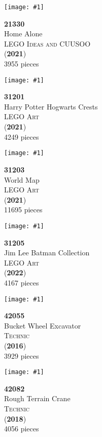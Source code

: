 \documentclass[letterpaper]{article}%
\newenvironment{legocell}[1]
{
	\begin{minipage}[c][2.0in][c]{4in}
	\centering
	\varwidth{3.6in}
	\raggedright %
	\begin{minipage}[c]{1.3in}
		\texttt{[image: \#1]}
	\end{minipage}
	\begin{minipage}[c]{2.2in}
	\raggedright
}
{
	\end{minipage}
	\endvarwidth
	\end{minipage}
	\allowbreak
	\ignorespaces
}
\begin{document}
\begin{legocell}{images/set_21330-1.jpg}
\textbf{21330}\\
{\sffamily\large Home Alone}\\
\textsc{\color{DarkBlue}\normalsize LEGO Ideas and CUUSOO}\\
(\textbf{2021})\\
{\normalsize 3955 pieces}\\
\end{legocell}
\begin{legocell}{images/set_31201-1.jpg}
\textbf{31201}\\
{\sffamily\large Harry Potter Hogwarts Crests}\\
\textsc{\color{DarkBlue}\normalsize LEGO Art}\\
(\textbf{2021})\\
{\normalsize 4249 pieces}\\
\end{legocell}
\begin{legocell}{images/set_31203-1.jpg}
\textbf{31203}\\
{\sffamily\large World Map}\\
\textsc{\color{DarkBlue}\normalsize LEGO Art}\\
(\textbf{2021})\\
{\normalsize 11695 pieces}\\
\end{legocell}
\begin{legocell}{images/set_31205-1.jpg}
\textbf{31205}\\
{\sffamily\large Jim Lee Batman Collection}\\
\textsc{\color{DarkBlue}\normalsize LEGO Art}\\
(\textbf{2022})\\
{\normalsize 4167 pieces}\\
\end{legocell}
\begin{legocell}{images/set_42055-1.jpg}
\textbf{42055}\\
{\sffamily\large Bucket Wheel Excavator}\\
\textsc{\color{DarkBlue}\normalsize Technic}\\
(\textbf{2016})\\
{\normalsize 3929 pieces}\\
\end{legocell}
\begin{legocell}{images/set_42082-1.jpg}
\textbf{42082}\\
{\sffamily\large Rough Terrain Crane}\\
\textsc{\color{DarkBlue}\normalsize Technic}\\
(\textbf{2018})\\
{\normalsize 4056 pieces}\\
\end{legocell}
\end{document}
